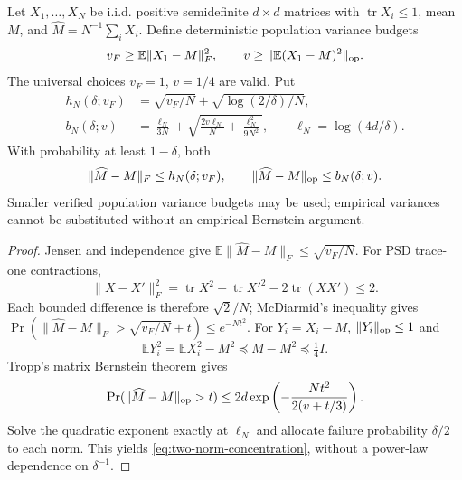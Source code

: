 \begin{lemma}
\label{lem:sharp-covariance-concentration}
Let $X_1,\ldots,X_N$ be i.i.d. positive semidefinite $d\times d$ matrices
with $\operatorname{tr}X_i\le1$, mean $M$, and $\widehat M=N^{-1}\sum_iX_i$.
Define deterministic population variance budgets
\begin{equation}
 v_F\ge\mathbb E\|X_1-M\|_F^2,\qquad
 v\ge\|\mathbb E(X_1-M)^2\|_{\rm op}.
\end{equation}
The universal choices $v_F=1$, $v=1/4$ are valid. Put
\begin{align}
 h_N(\delta;v_F)&=\sqrt{v_F/N}+\sqrt{\log(2/\delta)/N},\\
 b_N(\delta;v)&=\frac{\ell_N}{3N}+
             \sqrt{\frac{2v\ell_N}{N}+\frac{\ell_N^2}{9N^2}},
 \qquad\ell_N=\log(4d/\delta).
\end{align}
With probability at least $1-\delta$, both
\begin{equation}
 \|\widehat M-M\|_F\le h_N(\delta;v_F),\qquad
 \|\widehat M-M\|_{\rm op}\le b_N(\delta;v).
 \label{eq:two-norm-concentration}
\end{equation}
Smaller verified population variance budgets may be used; empirical
variances cannot be substituted without an empirical-Bernstein argument.
\end{lemma}
\begin{proof}
Jensen and independence give
$\mathbb E\|\widehat M-M\|_F\le\sqrt{v_F/N}$.
For PSD trace-one contractions,
\begin{equation}
 \|X-X'\|_F^2=\operatorname{tr}X^2+\operatorname{tr}X'^2
                         -2\operatorname{tr}(XX')\le2.
\end{equation}
Each bounded difference is therefore $\sqrt2/N$; McDiarmid's inequality
\cite{mcdiarmid1989bounded} gives
$\Pr(\|\widehat M-M\|_F>\sqrt{v_F/N}+t)\le e^{-Nt^2}$.
For $Y_i=X_i-M$, $\|Y_i\|_{\rm op}\le1$ and
\begin{equation}
 \mathbb EY_i^2=\mathbb EX_i^2-M^2\preceq M-M^2\preceq\tfrac14I.
\end{equation}
Tropp's matrix Bernstein theorem \citep[Theorem 1.4]{tropp2012user} gives
\begin{equation}
 \Pr(\|\widehat M-M\|_{\rm op}>t)
 \le2d\exp\left(-\frac{Nt^2}{2(v+t/3)}\right).
\end{equation}
Solve the quadratic exponent exactly at $\ell_N$ and allocate failure
probability $\delta/2$ to each norm. This yields
\eqref{eq:two-norm-concentration}, without a power-law dependence on
$\delta^{-1}$.
\end{proof}

